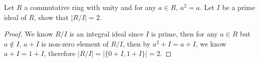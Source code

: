 \documentclass[../main.tex]{subfiles}
\begin{document}
\setcounter{exercise}{80}
\begin{exercise}
  Let $R$ a commutative ring with unity and for any $a \in R$, $a^2 = a$.
  Let $I$ be a prime ideal of $R$, show that $|R/I| = 2$.
\end{exercise}
\begin{proof}
  We know $R/I$ is an integral ideal since $I$ is prime, then
  for any $a \in R$ but $a \notin I$, $a + I$ is non-zero element of $R/I$,
  then by $a^2 + I = a + I$, we know $a + I = 1 + I$,
  therefore $|R/I| = |\{ 0 + I, 1 + I \}| = 2$.
\end{proof}
\end{document}
